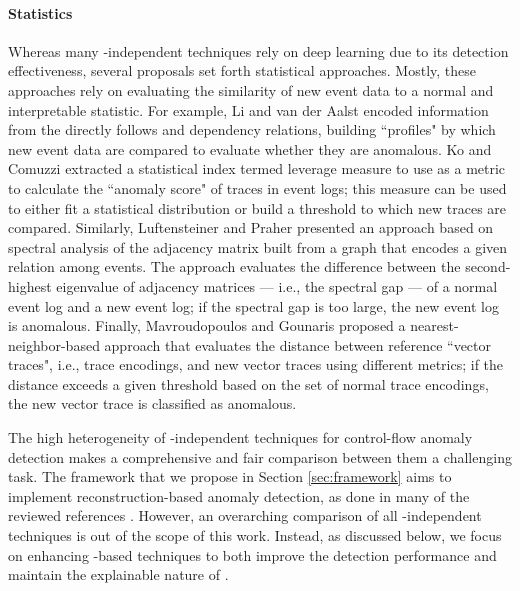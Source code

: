 \paragraph{Statistics}Whereas many -independent techniques rely on deep learning due to its detection effectiveness, several proposals set forth statistical approaches. Mostly, these approaches rely on evaluating the similarity of new event data to a normal and interpretable statistic. For example, Li and van der Aalst \cite{li2017frameworkdeviations} encoded information from the directly follows and dependency relations, building ``profiles" by which new event data are compared to evaluate whether they are anomalous. Ko and Comuzzi \cite{ko2021statisticaladbp} extracted a statistical index termed leverage measure to use as a metric to calculate the ``anomaly score" of traces in event logs; this measure can be used to either fit a statistical distribution or build a threshold to which new traces are compared. Similarly, Luftensteiner and Praher \cite{luftensteiner2022adpmgraphs} presented an approach based on spectral analysis of the adjacency matrix built from a graph that encodes a given relation among events. The approach evaluates the difference between the second-highest eigenvalue of adjacency matrices --- i.e., the spectral gap --- of a normal event log and a new event log; if the spectral gap is too large, the new event log is anomalous. Finally, Mavroudopoulos and Gounaris \cite{manvroudopoulos2022proximitybasedtemporalad} proposed a nearest-neighbor-based approach that evaluates the distance between reference ``vector traces", i.e., trace encodings, and new vector traces using different metrics; if the distance exceeds a given threshold based on the set of normal trace encodings, the new vector trace is classified as anomalous.

The high heterogeneity of -independent techniques for control-flow anomaly detection makes a comprehensive and fair comparison between them a challenging task. The framework that we propose in Section \ref{sec:framework} aims to implement reconstruction-based anomaly detection, as done in many of the reviewed references \cite{nolle2018processadautoencoders, vijayakamal2020bpaead, elaziz2023drlbpad, chinnaiah2024deepaead, kan2024aebasedelad}. However, an overarching comparison of all -independent techniques is out of the scope of this work. Instead, as discussed below, we focus on enhancing -based techniques to both improve the detection performance and maintain the explainable nature of .

